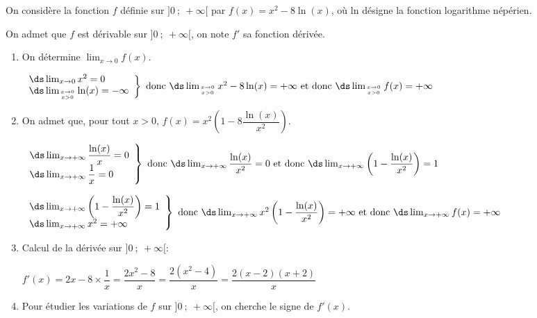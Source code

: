 
\medskip

On considère la fonction $f$ définie sur $]0~;~+\infty[$ par 
$f(x) = x^2 - 8\ln (x)$,
où ln désigne la fonction logarithme népérien.

On admet que $f$ est dérivable sur $]0~;~+\infty[$, on note $f'$ sa fonction dérivée. 

\medskip

\begin{enumerate}
\item On détermine $\displaystyle\lim_{x \to 0} f(x)$.

$\left .
\begin{array}{l}
\ds\lim_{x \to 0} x^2 =0\\
\ds\lim_{x \to 0 \atop x>0} \ln(x)=-\infty
\end{array}
\right \}
\text{ donc }
\ds\lim_{x \to 0\atop x>0} x^2 -8\ln(x)=+\infty
\text{ et donc }
\ds\lim_{x \to 0\atop x>0} f(x)=+\infty$


\item On admet que, pour tout $x > 0$,\: $f(x) = x^2\left(1 - 8\dfrac{\ln (x)}{x^2}\right)$.

$\left .
\begin{array}{l}
\ds\lim_{x \to +\infty} \dfrac{\ln(x)}{x} =0\\
\ds\lim_{x \to +\infty} \dfrac{1}{x}=0 
\end{array}
\right \}
\text{ donc }
\ds\lim_{x \to +\infty} \dfrac{\ln(x)}{x^2} =0
\text{ et donc }
\ds\lim_{x \to +\infty} \left ( 1-\dfrac{\ln(x)}{x^2}\right ) =1$

$\left .
\begin{array}{l}
\ds\lim_{x \to +\infty}  \left ( 1-\dfrac{\ln(x)}{x^2}\right ) =1\\
\ds\lim_{x \to +\infty} x^2=+\infty
\end{array}
\right \}
\text{ donc }
\ds\lim_{x \to +\infty}  x^2\left ( 1-\dfrac{\ln(x)}{x^2}\right ) =+\infty
\text{ et donc }
\ds\lim_{x \to +\infty}  f(x) =+\infty$

\item %
Calcul de la dérivée sur $]0~;~+\infty[$:

$f'(x)=2x -8\times \dfrac{1}{x}=\dfrac{2x^2-8}{x}=\dfrac{2\left (x^2-4\right )}{x}
=\dfrac{2(x-2)(x+2)}{x}$

\item Pour étudier les variations de $f$ sur $]0~;~+\infty[$, on cherche le signe de $f'(x)$.%


\end{enumerate}
